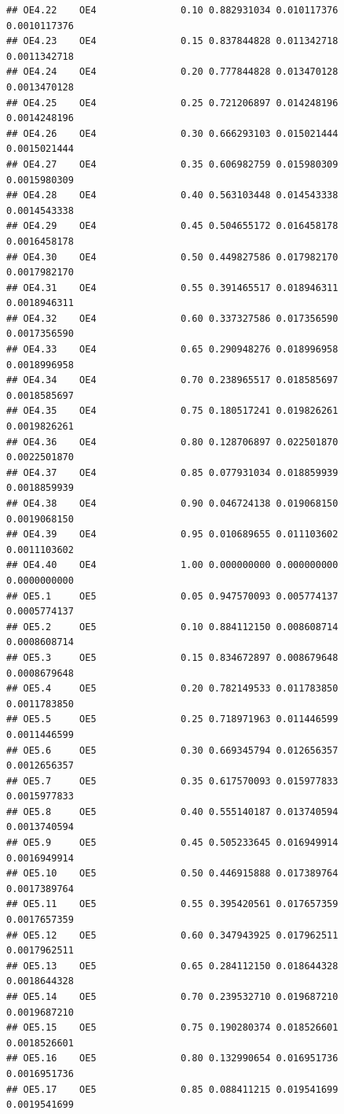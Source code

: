 \documentclass[
]{book}
\begin{document}
\begin{verbatim}
## OE4.22    OE4               0.10 0.882931034 0.010117376 0.0010117376
## OE4.23    OE4               0.15 0.837844828 0.011342718 0.0011342718
## OE4.24    OE4               0.20 0.777844828 0.013470128 0.0013470128
## OE4.25    OE4               0.25 0.721206897 0.014248196 0.0014248196
## OE4.26    OE4               0.30 0.666293103 0.015021444 0.0015021444
## OE4.27    OE4               0.35 0.606982759 0.015980309 0.0015980309
## OE4.28    OE4               0.40 0.563103448 0.014543338 0.0014543338
## OE4.29    OE4               0.45 0.504655172 0.016458178 0.0016458178
## OE4.30    OE4               0.50 0.449827586 0.017982170 0.0017982170
## OE4.31    OE4               0.55 0.391465517 0.018946311 0.0018946311
## OE4.32    OE4               0.60 0.337327586 0.017356590 0.0017356590
## OE4.33    OE4               0.65 0.290948276 0.018996958 0.0018996958
## OE4.34    OE4               0.70 0.238965517 0.018585697 0.0018585697
## OE4.35    OE4               0.75 0.180517241 0.019826261 0.0019826261
## OE4.36    OE4               0.80 0.128706897 0.022501870 0.0022501870
## OE4.37    OE4               0.85 0.077931034 0.018859939 0.0018859939
## OE4.38    OE4               0.90 0.046724138 0.019068150 0.0019068150
## OE4.39    OE4               0.95 0.010689655 0.011103602 0.0011103602
## OE4.40    OE4               1.00 0.000000000 0.000000000 0.0000000000
## OE5.1     OE5               0.05 0.947570093 0.005774137 0.0005774137
## OE5.2     OE5               0.10 0.884112150 0.008608714 0.0008608714
## OE5.3     OE5               0.15 0.834672897 0.008679648 0.0008679648
## OE5.4     OE5               0.20 0.782149533 0.011783850 0.0011783850
## OE5.5     OE5               0.25 0.718971963 0.011446599 0.0011446599
## OE5.6     OE5               0.30 0.669345794 0.012656357 0.0012656357
## OE5.7     OE5               0.35 0.617570093 0.015977833 0.0015977833
## OE5.8     OE5               0.40 0.555140187 0.013740594 0.0013740594
## OE5.9     OE5               0.45 0.505233645 0.016949914 0.0016949914
## OE5.10    OE5               0.50 0.446915888 0.017389764 0.0017389764
## OE5.11    OE5               0.55 0.395420561 0.017657359 0.0017657359
## OE5.12    OE5               0.60 0.347943925 0.017962511 0.0017962511
## OE5.13    OE5               0.65 0.284112150 0.018644328 0.0018644328
## OE5.14    OE5               0.70 0.239532710 0.019687210 0.0019687210
## OE5.15    OE5               0.75 0.190280374 0.018526601 0.0018526601
## OE5.16    OE5               0.80 0.132990654 0.016951736 0.0016951736
## OE5.17    OE5               0.85 0.088411215 0.019541699 0.0019541699

\end{verbatim}
\end{document}
